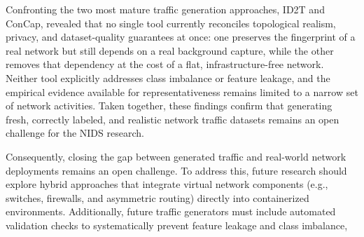 \documentclass[conference]{IEEEtran}
\begin{document}
Confronting the two most mature traffic generation approaches, ID2T
and ConCap, revealed that no single tool currently reconciles
topological realism, privacy, and dataset-quality guarantees at once:
one preserves the fingerprint of a real network but still depends on
a real background capture, while the other removes that dependency
at the cost of a flat, infrastructure-free network. Neither tool
explicitly addresses class imbalance or feature leakage, and the
empirical evidence available for representativeness remains limited
to a narrow set of network activities. Taken together, these findings
confirm that generating fresh, correctly labeled, and realistic
network traffic datasets remains an open challenge for the NIDS
research.

Consequently, closing the gap between generated traffic and real-world network 
deployments remains an open challenge. To address this, future research 
should explore hybrid approaches that integrate virtual network components 
(e.g., switches, firewalls, and asymmetric routing) directly into containerized 
environments. Additionally, future traffic generators must include automated 
validation checks to systematically prevent feature leakage and class imbalance,


\newpage
\printbibliography
\end{document}
